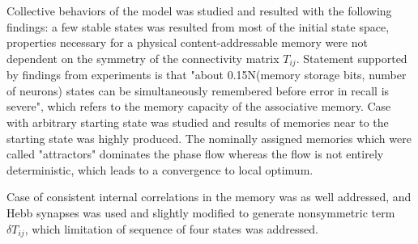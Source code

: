 Collective behaviors of the model was studied and resulted with the following findings: a few stable states was resulted from most of the initial state space, properties necessary for a physical content-addressable memory were not dependent on the symmetry of the connectivity matrix $T_{ij}$. Statement supported by findings from experiments is that "about 0.15N(memory storage bits, number of neurons) states can be simultaneously remembered before error in recall is severe", which refers to the memory capacity of the associative memory. Case with arbitrary starting state was studied and results of memories near to the starting state was highly produced. The nominally assigned memories which were called "attractors" dominates the phase flow whereas the flow is not entirely deterministic, which leads to a convergence to local optimum.

Case of consistent internal correlations in the memory was as well addressed, and Hebb synapses was used and slightly modified to generate nonsymmetric term~$\delta T_{ij}$, which limitation of sequence of four states was addressed.

